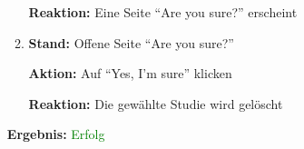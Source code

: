 \documentclass[a4paper]{scrreprt}
\begin{document}
\begin{itemize}
\begin{enumerate}
		                                    \par \textbf{Reaktion: }Eine Seite ``Are you sure?'' erscheint
		      						\item \par \textbf{Stand: }Offene Seite ``Are you sure?''
		                                    \par \textbf{Aktion: }Auf ``Yes, I'm sure'' klicken
		                                    \par \textbf{Reaktion: }Die gew\"ahlte Studie wird gel\"oscht
		                          \end{enumerate}
		      					\vspace*{0.3cm}
		      		           \par \textbf{Ergebnis: }\textcolor{green}{Erfolg}
		      		           \vspace*{0.6cm}
		      		

\end{itemize}
\end{document}
